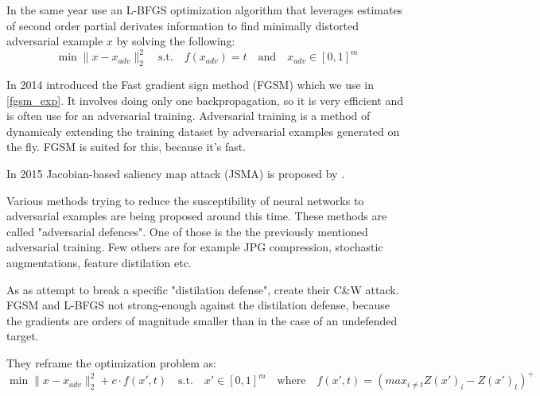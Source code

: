 In the same year \cite{szegedy2014intriguing} use an L-BFGS optimization algorithm that leverages estimates of second order partial derivates information to find minimally distorted adversarial example $x$ by solving the following:
$$\min \lVert x - x_{adv} \rVert_2^2 \quad \text{s.t.} \quad f(x_{adv}) = t \quad \text{and} \quad x_{adv} \in [0, 1]^m$$


In 2014 \cite{goodfellow2015explaining} introduced the Fast gradient sign method (FGSM) which we use in \ref{fgsm_exp}. It involves doing only one backpropagation, so it is very efficient and is often use for an adversarial training. Adversarial training is a method of dynamicaly extending the training dataset by adversarial examples generated on the fly. FGSM is suited for this, because it's fast.

In 2015 Jacobian-based saliency map attack (JSMA) is proposed by \cite{papernot2015limitations}.

Various methods trying to reduce the susceptibility of neural networks to adversarial examples are being proposed around this time. These methods are called "adversarial defences". One of those is the the previously mentioned adversarial training. Few others are for example JPG compression, stochastic augmentations, feature distilation etc.

As as attempt to break a specific "distilation defense", \cite{carlini2017evaluating} create their C\&W attack. FGSM and L-BFGS not strong-enough against the distilation defense, because the gradients are orders of magnitude smaller than in the case of an undefended target.

They reframe the optimization problem as:
$$\min \lVert x - x_{adv} \rVert^2_2 + c \cdot f(x', t) \quad \text{s.t.} \quad x' \in [0, 1]^m \quad \text{where} \quad f(x', t) = (max_{i \neq t} Z(x')_i - Z(x')_t)^+$$



